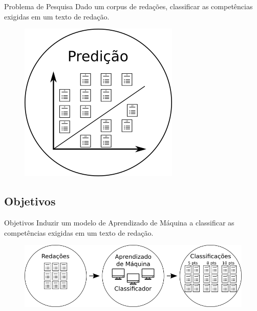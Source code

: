 \documentclass[10pt]{beamer}
\begin{document}
    \begin{frame}[fragile]{Problema de Pesquisa}
    Dado um corpus de redações, classificar as competências exigidas em um texto de redação.
    \begin{figure}[H]
    \begin{center}
        \includegraphics[scale=0.50]{images/prediction.png}
    \end{center}
    \end{figure}
    \end{frame}

  \subsection{Objetivos}
    \begin{frame}[fragile]{Objetivos}
    Induzir um modelo de Aprendizado de Máquina a classificar as competências exigidas em um texto de redação.

    \begin{figure}[H]
    \begin{center}
        \includegraphics[scale=0.50]{images/automatic_essay_system.png}
    \end{center}
    \end{figure}
    \end{frame}
\end{document}
